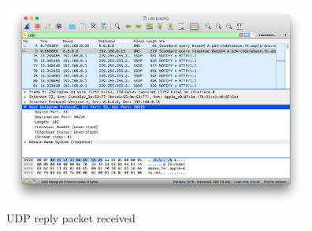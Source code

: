 \documentclass[11pt]{article}
\begin{document}
\begin{itemize}
		\begin{figure}[H]
		\centering
		\caption{UDP reply packet received}
		\includegraphics[width=380px]{06}
		\end{figure}

\end{itemize}
\end{document}
